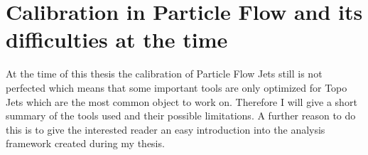\section{Calibration in Particle Flow and its difficulties at the time}

At the time of this thesis the calibration of Particle Flow Jets still is not perfected which means that some important tools are only optimized for Topo Jets which are the most common object to work on. Therefore I will give a short summary of the tools used and their possible limitations. A further reason to do this is to give the interested reader an easy introduction into the analysis framework created during my thesis.

